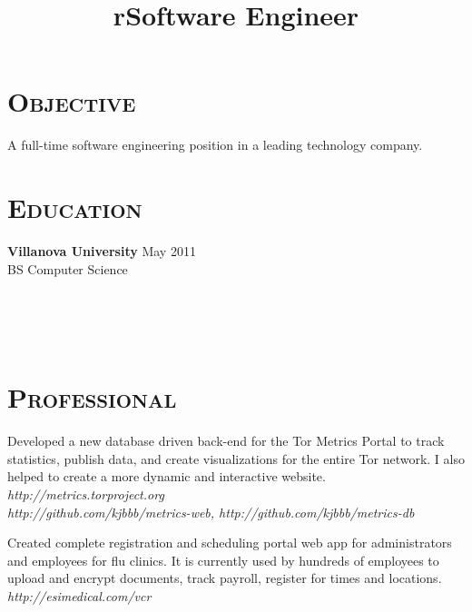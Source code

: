 \begin{resume}


\section{\textsc{Objective}}
A full-time software engineering position in a leading technology company.
\section{\textsc{Education}}

\textbf{Villanova University} \hfill May 2011 \\
BS Computer Science
\newline


\begin{formatb}
  \title{r}\\
  \\
  \body\\
\end{formatb}

\section{\textsc{Professional}}

\title{}
\begin{position}
Developed a new database driven back-end for the Tor Metrics Portal to track
statistics, publish data, and create visualizations for the entire Tor network.
I also helped to create a more dynamic and interactive website. \\
{\itshape http://metrics.torproject.org} \\
{\itshape http://github.com/kjbbb/metrics-web, http://github.com/kjbbb/metrics-db}
\end{position}

\title{Software Engineer}
\begin{position}
Created complete registration and scheduling portal web app for administrators
and employees for flu clinics. It is currently used by hundreds of employees to
upload and encrypt documents, track payroll, register for times and locations.
\\ {\itshape http://esimedical.com/vcr}
\end{position}


\end{resume}
